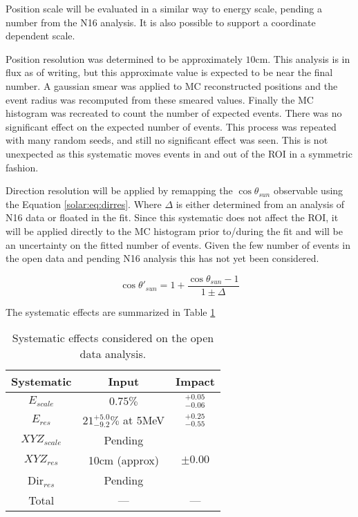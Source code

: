 Position scale will be evaluated in a similar way to energy scale, pending a
number from the N16 analysis. It is also possible to support a coordinate 
dependent scale.

Position resolution was determined to be approximately $10$cm. This analysis
is in flux as of writing, but this approximate value is expected to be near
the final number. A gaussian smear was applied to MC reconstructed positions 
and the event radius was recomputed from these smeared values. Finally the MC 
histogram was recreated to count the number of expected events. There was no 
significant effect on the expected number of events. This process was repeated
with many random seeds, and still no significant effect was seen. This is not
unexpected as this systematic moves events in and out of the ROI in a symmetric
fashion.

Direction resolution will be applied by remapping the $\cos{\theta_{sun}}$ 
observable using the Equation \ref{solar:eq:dirres}. Where $\Delta$ is either
determined from an analysis of N16 data or floated in the fit. Since this 
systematic does not affect the ROI, it will be applied directly to the MC 
histogram prior to/during the fit and will be an uncertainty on the fitted
number of events. Given the few number of events in the open data and pending
N16 analysis this has not yet been considered.

\begin{equation}
\cos{\theta'_{sun}} = 1 + \frac{\cos{\theta_{sun}}-1}{1\pm\Delta}
\label{solar:eq:dirres}
\end{equation}

The systematic effects are summarized in Table \ref{tbl:solar:systben}

\begin{table}[]
\begin{center}
\begin{tabular}{c|c|c}
Systematic & Input & Impact \\ \hline
$E_{scale}$		& $0.75\%$ & $^{+0.05}_{-0.06}$  \rule{0pt}{2.6ex}\rule[-1.2ex]{0pt}{0pt}  \\
$E_{res}$		& $21^{+5.0}_{-9.2}\%$ at 5MeV & $^{+0.25}_{-0.55}$  \rule{0pt}{2.6ex}\rule[-1.2ex]{0pt}{0pt}  \\
${XYZ}_{scale}$	& Pending &  \rule{0pt}{2.6ex}\rule[-1.2ex]{0pt}{0pt}  \\
${XYZ}_{res}$		& 10cm (approx) & $\pm0.00$  \rule{0pt}{2.6ex}\rule[-1.2ex]{0pt}{0pt}  \\
Dir$_{res}$ 	& Pending & \rule{0pt}{2.6ex}\rule[-1.2ex]{0pt}{0pt}  \\ \hline
Total			& --- &  --- \rule{0pt}{2.6ex}\rule[-1.2ex]{0pt}{0pt}  
\end{tabular}
\caption{Systematic effects considered on the open data analysis.}
\label{tbl:solar:systben}
\end{center}
\end{table}

